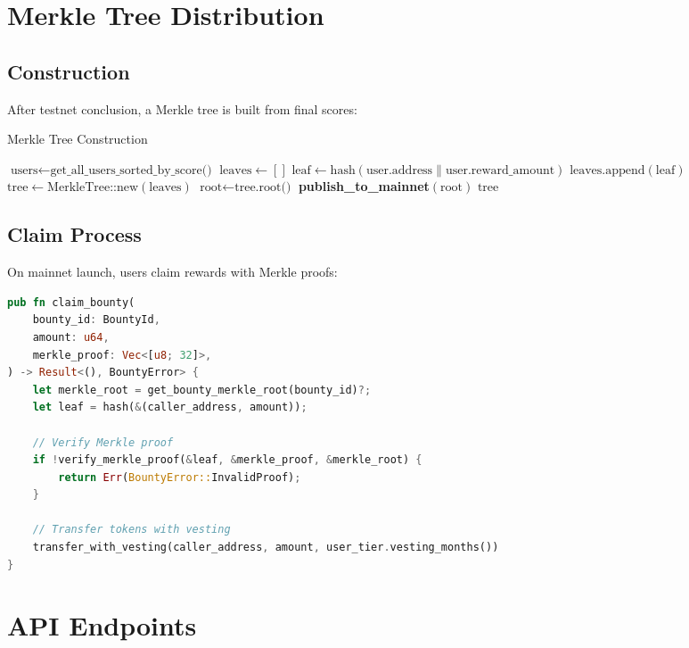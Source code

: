 \documentclass[11pt,a4paper]{article}
\begin{document}
\section{Merkle Tree Distribution}

\subsection{Construction}

After testnet conclusion, a Merkle tree is built from final scores:

\begin{algorithm}
\caption{Merkle Tree Construction}
\begin{algorithmic}[1]
\State $\text{users} \gets \text{get\_all\_users\_sorted\_by\_score()}$
\State $\text{leaves} \gets []$
    \State $\text{leaf} \gets \text{hash}(\text{user.address} \parallel \text{user.reward\_amount})$
    \State $\text{leaves.append}(\text{leaf})$
\EndFor
\State $\text{tree} \gets \text{MerkleTree::new}(\text{leaves})$
\State $\text{root} \gets \text{tree.root()}$
\State \textbf{publish\_to\_mainnet}$(\text{root})$
\State \Return $\text{tree}$
\end{algorithmic}
\end{algorithm}

\subsection{Claim Process}

On mainnet launch, users claim rewards with Merkle proofs:

\begin{lstlisting}[language=rust]
pub fn claim_bounty(
    bounty_id: BountyId,
    amount: u64,
    merkle_proof: Vec<[u8; 32]>,
) -> Result<(), BountyError> {
    let merkle_root = get_bounty_merkle_root(bounty_id)?;
    let leaf = hash(&(caller_address, amount));

    // Verify Merkle proof
    if !verify_merkle_proof(&leaf, &merkle_proof, &merkle_root) {
        return Err(BountyError::InvalidProof);
    }

    // Transfer tokens with vesting
    transfer_with_vesting(caller_address, amount, user_tier.vesting_months())
}
\end{lstlisting}

\section{API Endpoints}
\end{document}
